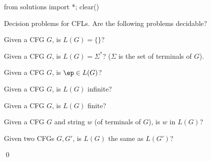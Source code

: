 \begin{python0}
from solutions import *; clear()
\end{python0}

\begin{ex}
  Decision problems for CFLs.
  Are the following problems decidable?
  \begin{tightlist}
    \item Given a CFG $G$, is $L(G) = \{\}$?
    \item Given a CFG $G$, is $L(G) = \Sigma^*$? ($\Sigma$ is the
    set of terminals of $G$).
    \item Given a CFG $G$, is $\ep \in L(G)$?
    \item Given a CFG $G$, is $L(G)$ infinite?
    \item Given a CFG $G$, is $L(G)$ finite?
    \item Given a CFG $G$ and string $w$ (of terminals of $G$),
    is $w$ in $L(G)$?
    \item Given two CFGs $G, G'$, is $L(G)$ the same as $L(G')$?
  \end{tightlist}
  \qed
\end{ex}

